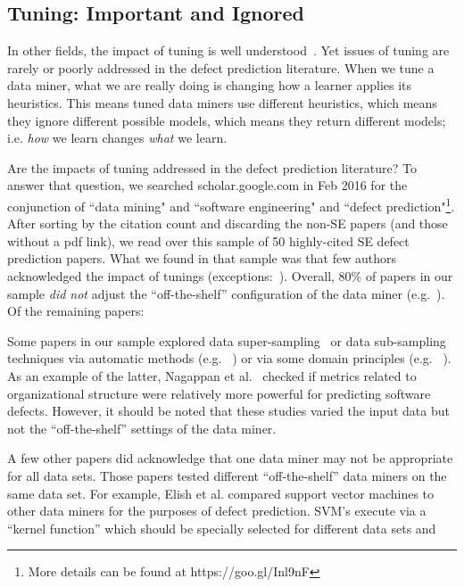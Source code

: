 

 


\subsection{Tuning: Important and Ignored}

In  other fields, the impact of tuning is well understood~\cite{Bergstra2012}. 
Yet issues of tuning  are rarely or poorly addressed
in the defect prediction literature.
When we tune a data miner, what we are really doing is changing how a learner applies
its heuristics. This means tuned data miners use different heuristics, which means they ignore different possible models, which means they return different models; i.e.  {\em how} we learn changes {\em what} we learn.

Are the impacts of tuning addressed in the defect prediction literature?
To answer that question,  we searched scholar.google.com in Feb 2016  for the conjunction of ``data mining" and ``software engineering" and  ``defect prediction"\footnote{More details can be found at https://goo.gl/Inl9nF}.
After sorting by the citation count and discarding the non-SE papers (and those without a pdf link), we read over this sample
of  50 highly-cited SE defect prediction papers. 
What we found in that sample was that few authors
acknowledged the impact of tunings (exceptions:~\cite{Gao:2011,lessmann2008benchmarking}).
Overall,  80\% of papers in our sample {\em did not} adjust
the ``off-the-shelf'' configuration of the data miner (e.g.~\cite{me07b,Moser:2008,Elish2008649}). Of the remaining papers:
\bi
\item
Some papers in our sample  explored   data super-sampling~\cite{4271036} or data sub-sampling techniques via  automatic methods (e.g. ~\cite{Gao:2011,me07b,4271036,Kim:2011}) 
or via some domain principles (e.g. ~\cite{Moser:2008,Nagappan:2008,Hassan:2009}).
As an example of the latter, Nagappan et al.~\cite{Nagappan:2008} checked if metrics related to organizational structure were relatively more powerful for predicting software defects. 
However, it should be noted that  these studies varied the input data but
not the   ``off-the-shelf''   settings of the data miner.
\item
A few other papers did acknowledge that one data miner may not be appropriate
for all data sets.  Those papers tested  different  
``off-the-shelf'' data miners on the same data set.
For example, Elish et al.\cite{Elish2008649}  compared support vector
machines to other data miners for the purposes of defect prediction. SVM's execute via a ``kernel function'' which should be specially selected for different data sets and
